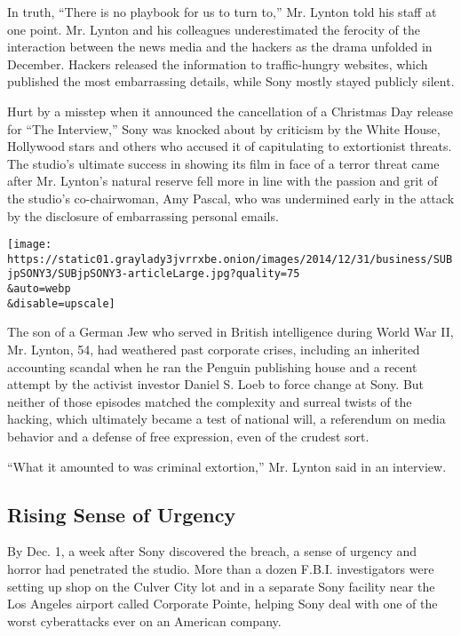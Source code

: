 In truth, ``There is no playbook for us to turn to,'' Mr. Lynton told
his staff at one point. Mr. Lynton and his colleagues underestimated the
ferocity of the interaction between the news media and the hackers as
the drama unfolded in December. Hackers released the information to
traffic-hungry websites, which published the most embarrassing details,
while Sony mostly stayed publicly silent.

Hurt by a misstep when it announced the cancellation of a Christmas Day
release for ``The Interview,'' Sony was knocked about by criticism by
the White House, Hollywood stars and others who accused it of
capitulating to extortionist threats. The studio's ultimate success in
showing its film in face of a terror threat came after Mr. Lynton's
natural reserve fell more in line with the passion and grit of the
studio's co-chairwoman, Amy Pascal, who was undermined early in the
attack by the disclosure of embarrassing personal emails.

\texttt{[image: https://static01.graylady3jvrrxbe.onion/images/2014/12/31/business/SUBjpSONY3/SUBjpSONY3-articleLarge.jpg?quality=75\\\&auto=webp\\\&disable=upscale]}

The son of a German Jew who served in British intelligence during World
War II, Mr. Lynton, 54, had weathered past corporate crises, including
an inherited accounting scandal when he ran the Penguin publishing house
and a recent attempt by the activist investor Daniel S. Loeb to force
change at Sony. But neither of those episodes matched the complexity and
surreal twists of the hacking, which ultimately became a test of
national will, a referendum on media behavior and a defense of free
expression, even of the crudest sort.

``What it amounted to was criminal extortion,'' Mr. Lynton said in an
interview.

\hypertarget{rising-sense-of-urgency}{%
\subsection{Rising Sense of Urgency}\label{rising-sense-of-urgency}}

By Dec. 1, a week after Sony discovered the breach, a sense of urgency
and horror had penetrated the studio. More than a dozen F.B.I.
investigators were setting up shop on the Culver City lot and in a
separate Sony facility near the Los Angeles airport called Corporate
Pointe, helping Sony deal with one of the worst cyberattacks ever on an
American company.

